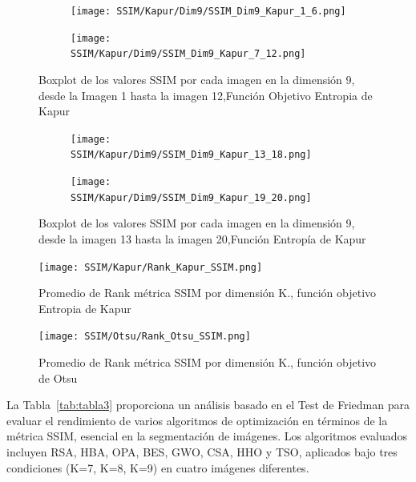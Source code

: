 \documentclass[conference]{IEEEtran}
\begin{document}
\begin{figure}
	\centering
	
	\begin{subfigure}{0.5\textwidth}
		\texttt{[image: SSIM/Kapur/Dim9/SSIM\_Dim9\_Kapur\_1\_6.png]}
	\end{subfigure}
	
	\begin{subfigure}{0.5\textwidth}
		\texttt{[image: SSIM/Kapur/Dim9/SSIM\_Dim9\_Kapur\_7\_12.png]}
	\end{subfigure}
	\caption{Boxplot de los valores SSIM por cada imagen en la dimensión 9, desde la Imagen 1 hasta la imagen 12,Función Objetivo Entropia de Kapur}
	\label{fig:imagenes}    
\end{figure}

\begin{figure}
	\centering
	\begin{subfigure}{0.5\textwidth}
		\texttt{[image: SSIM/Kapur/Dim9/SSIM\_Dim9\_Kapur\_13\_18.png]}
	\end{subfigure}   
	\begin{subfigure}{0.5\textwidth}
		\texttt{[image: SSIM/Kapur/Dim9/SSIM\_Dim9\_Kapur\_19\_20.png]}
		\vspace{-150pt} %
	\end{subfigure}
	\caption{Boxplot de los valores SSIM por cada imagen en la dimensión 9, desde la imagen 13 hasta la imagen 20,Función Entropía de Kapur}
	\label{fig:imagenes}    
\end{figure}



\begin{figure}[!htb]
	\centering
	\texttt{[image: SSIM/Kapur/Rank\_Kapur\_SSIM.png]}
	\caption{Promedio de Rank métrica SSIM por dimensión K., función objetivo Entropia de Kapur}
	\label{fig:fig511}
\end{figure}

\begin{figure}[!htb]
	\centering
	\texttt{[image: SSIM/Otsu/Rank\_Otsu\_SSIM.png]}
	\caption{Promedio de Rank métrica SSIM por dimensión K., función objetivo de Otsu}
\end{figure}



\noindent La Tabla~\ref{tab:tabla3} proporciona un análisis basado en el Test de Friedman para evaluar el rendimiento de varios algoritmos de optimización en términos de la métrica SSIM, esencial en la segmentación de imágenes. Los algoritmos evaluados incluyen RSA, HBA, OPA, BES, GWO, CSA, HHO y TSO, aplicados bajo tres condiciones (K=7, K=8, K=9) en cuatro imágenes diferentes. 
\end{document}
